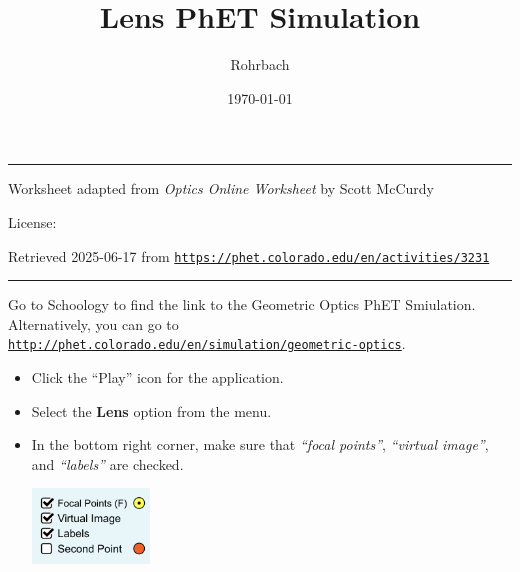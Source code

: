 \documentclass[10pt]{exam}
\title{Lens PhET Simulation}
\author{Rohrbach}
\date{\today}
\begin{document}
\maketitle

\hrule
\vspace{0.2em}
\noindent
{\footnotesize Worksheet adapted from \emph{Optics Online Worksheet} by Scott McCurdy }

{\footnotesize License:} \cc\hspace{-1em}

{\footnotesize Retrieved 2025-06-17 from \texttt{\href{https://phet.colorado.edu/en/activities/3231}{https://phet.colorado.edu/en/activities/3231}} }
\vspace{0.2em}
\hrule

\vspace{2em}

\noindent
Go to Schoology to find the link to the Geometric Optics PhET Smiulation.  Alternatively, you can go to \href{http://phet.colorado.edu/en/simulation/geometric-optics}{\texttt{http://phet.colorado.edu/en/simulation/geometric-optics}}.

\begin{itemize}
    \item Click the ``Play'' icon for the application.
    \item Select the \textbf{Lens} option from the menu.
    \item In the bottom right corner, make sure that \emph{``focal points''}, \emph{``virtual image''}, and \emph{``labels''} are checked.
    
    \hfill  \includegraphics[height=2cm]{checkboxes.png}

\end{itemize}
\end{document}
